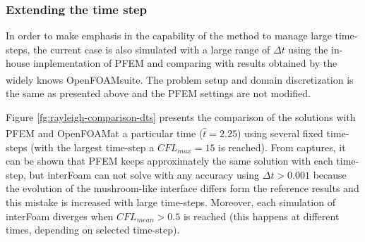 \documentclass[a4paper,conference]{IEEEtran}
\newcommand{\OF}{OpenFOAM\textsuperscript{\textregistered}}
\begin{document}
\subsubsection{Extending the time step}

In order to make emphasis in the capability of the method to manage large time-steps, the current case is also simulated with a large range of $\Delta t$ using the in-house implementation of PFEM and comparing with results obtained by the widely knows \OF suite. The problem setup and domain discretization is the same as presented above and the PFEM settings are not modified.


Figure \ref{fg:rayleigh-comparison-dts} presents the comparison of the solutions with PFEM and \OF at a particular time ($\widehat{t}=2.25$) using several fixed time-steps (with the largest time-step a $CFL_{max}=15$ is reached). From captures, it can be shown that PFEM keeps approximately the same solution with each time-step, but interFoam can not solve with any accuracy using $\Delta t>0.001$ because the evolution of the mushroom-like interface differs form the reference results and this mistake is increased with large time-steps. Moreover, each simulation of interFoam diverges when $CFL_{mean}>0.5$ is reached (this happens at different times, depending on selected time-step).
\end{document}
